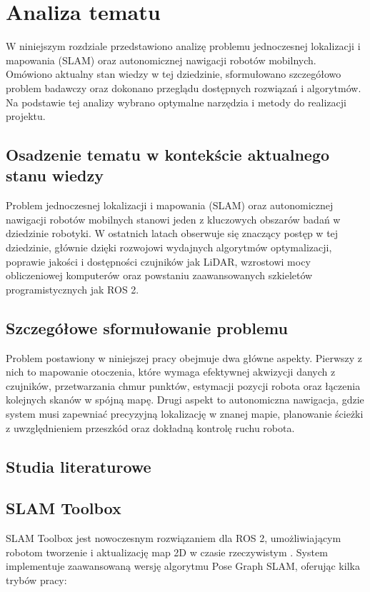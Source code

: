\documentclass[a4paper,twoside,12pt]{book}
\begin{document}
\chapter{Analiza tematu}
\label{ch:Analiza-Tematu}
W niniejszym rozdziale przedstawiono analizę problemu jednoczesnej lokalizacji i mapowania (SLAM) oraz autonomicznej nawigacji robotów mobilnych. Omówiono aktualny stan wiedzy w tej dziedzinie, sformułowano szczegółowo problem badawczy oraz dokonano przeglądu dostępnych rozwiązań i algorytmów. Na podstawie tej analizy wybrano optymalne narzędzia i metody do realizacji projektu.

\section{Osadzenie tematu w kontekście aktualnego stanu wiedzy}
Problem jednoczesnej lokalizacji i mapowania (SLAM) oraz autonomicznej nawigacji robotów mobilnych stanowi jeden z kluczowych obszarów badań w dziedzinie robotyki. W ostatnich latach obserwuje się znaczący postęp w tej dziedzinie, głównie dzięki rozwojowi wydajnych algorytmów optymalizacji, poprawie jakości i dostępności czujników jak LiDAR, wzrostowi mocy obliczeniowej komputerów oraz powstaniu zaawansowanych szkieletów programistycznych jak ROS 2.

\section{Szczegółowe sformułowanie problemu}
Problem postawiony w niniejszej pracy obejmuje dwa główne aspekty. Pierwszy z nich to mapowanie otoczenia, które wymaga efektywnej akwizycji danych z czujników, przetwarzania chmur punktów, estymacji pozycji robota oraz łączenia kolejnych skanów w spójną mapę. Drugi aspekt to autonomiczna nawigacja, gdzie system musi zapewniać precyzyjną lokalizację w znanej mapie, planowanie ścieżki z uwzględnieniem przeszkód oraz dokładną kontrolę ruchu robota.

\section{Studia literaturowe}
\section{SLAM Toolbox}
SLAM Toolbox jest nowoczesnym rozwiązaniem dla ROS 2, umożliwiającym robotom tworzenie i aktualizację map 2D w czasie rzeczywistym \cite{bib:slamtoolbox}. System implementuje zaawansowaną wersję algorytmu Pose Graph SLAM, oferując kilka trybów pracy:
\end{document}
